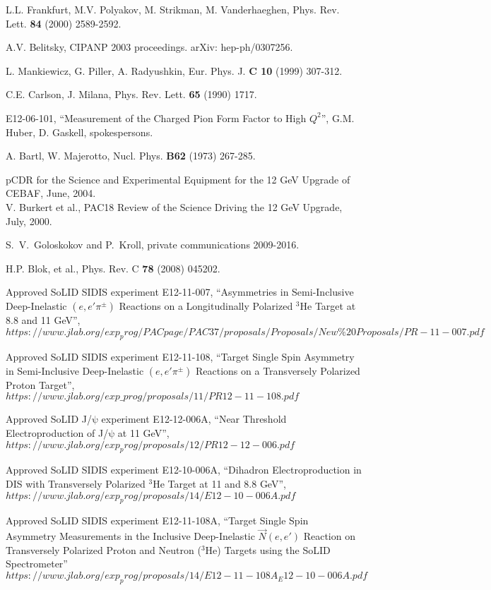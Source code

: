 \begin{thebibliography}{}
 L.L. Frankfurt, M.V. Polyakov, M. Strikman, M. Vanderhaeghen,
  Phys. Rev. Lett. {\bf 84} (2000) 2589-2592.

 A.V. Belitsky, CIPANP 2003 proceedings.  arXiv:
  hep-ph/0307256.

 L. Mankiewicz, G. Piller, A. Radyushkin, Eur. Phys. J. {\bf C
    10} (1999) 307-312.

 C.E. Carlson, J. Milana, Phys. Rev. Lett. {\bf 65} (1990) 1717.

 E12-06-101, ``Measurement of the Charged Pion Form Factor to
  High $Q^2$'', G.M. Huber, D. Gaskell, spokespersons.

 A. Bartl, W. Majerotto, Nucl. Phys. {\bf B62} (1973) 267-285.

 pCDR for the Science and Experimental Equipment for the 12 GeV
  Upgrade of CEBAF, June, 2004.\\
V. Burkert et al., PAC18 Review of the Science Driving the 12 GeV Upgrade, 
  July, 2000.

 S.~V.~Goloskokov and P.~Kroll, private communications 2009-2016.

 H.P. Blok, et al., Phys. Rev. C {\bf 78} (2008) 045202.

  Approved SoLID SIDIS experiment E12-11-007,
``Asymmetries in Semi-Inclusive Deep-Inelastic  $(e,e'\pi^{\pm})$ Reactions on a
Longitudinally Polarized $\mathrm{^{3}He}$ Target at 8.8 and 11 GeV'',
$https://www.jlab.org/exp_prog/PACpage/PAC37/proposals/Proposals/New\%20Proposals/PR-11-007.pdf$

  Approved SoLID SIDIS experiment E12-11-108,
``Target Single Spin Asymmetry in Semi-Inclusive Deep-Inelastic
$(e,e'\pi^{\pm})$ Reactions on a Transversely Polarized Proton Target'',
$https://www.jlab.org/exp\_prog/proposals/11/PR12-11-108.pdf$

  Approved SoLID J/$\mathrm{\psi}$ experiment E12-12-006A,
  ``Near Threshold Electroproduction of J/$\mathrm{\psi}$ at 11 GeV'',
$https://www.jlab.org/exp_prog/proposals/12/PR12-12-006.pdf$

  Approved SoLID SIDIS experiment E12-10-006A,
  ``Dihadron Electroproduction in DIS with  Transversely Polarized
  $\mathrm{^{3}He}$ Target at 11 and 8.8 GeV'',
$https://www.jlab.org/exp_prog/proposals/14/E12-10-006A.pdf$

   Approved SoLID SIDIS experiment E12-11-108A,
``Target Single Spin Asymmetry Measurements in the Inclusive Deep-Inelastic
$\vec{N}(e,e')$ Reaction on Transversely Polarized Proton and Neutron
($\mathrm{^{3}He}$) Targets using the SoLID Spectrometer''
$https://www.jlab.org/exp_prog/proposals/14/E12-11-108A_E12-10-006A.pdf$


\end{thebibliography}
